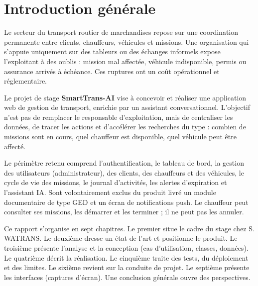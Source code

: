 \chapter*{Introduction générale}

Le secteur du transport routier de marchandises repose sur une coordination permanente entre clients, chauffeurs, véhicules et missions. Une organisation qui s'appuie uniquement sur des tableurs ou des échanges informels expose l'exploitant à des oublis : mission mal affectée, véhicule indisponible, permis ou assurance arrivés à échéance. Ces ruptures ont un coût opérationnel et réglementaire.

Le projet de stage \textbf{SmartTrans-AI} vise à concevoir et réaliser une application web de gestion de transport, enrichie par un assistant conversationnel. L'objectif n'est pas de remplacer le responsable d'exploitation, mais de centraliser les données, de tracer les actions et d'accélérer les recherches du type : combien de missions sont en cours, quel chauffeur est disponible, quel véhicule peut être affecté.

Le périmètre retenu comprend l'authentification, le tableau de bord, la gestion des utilisateurs (administrateur), des clients, des chauffeurs et des véhicules, le cycle de vie des missions, le journal d'activités, les alertes d'expiration et l'assistant IA. Sont volontairement exclus du produit livré un module documentaire de type GED et un écran de notifications push. Le chauffeur peut consulter ses missions, les démarrer et les terminer ; il ne peut pas les annuler.

Ce rapport s'organise en sept chapitres. Le premier situe le cadre du stage chez S. WATRANS. Le deuxième dresse un état de l'art et positionne le produit. Le troisième présente l'analyse et la conception (cas d'utilisation, classes, données). Le quatrième décrit la réalisation. Le cinquième traite des tests, du déploiement et des limites. Le sixième revient sur la conduite de projet. Le septième présente les interfaces (captures d'écran). Une conclusion générale ouvre des perspectives.
